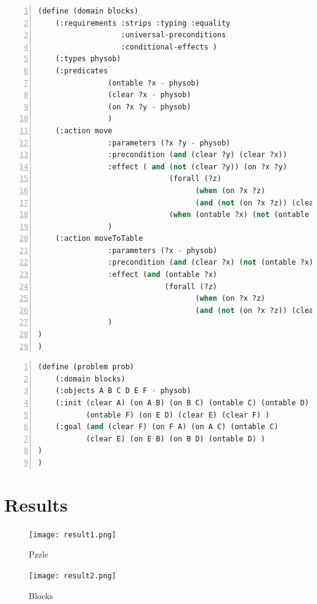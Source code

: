 ﻿\documentclass[a4paper, 11pt]{article}
\begin{document}
\begin{lstlisting}[title=domain\_blocks.pddl,frame=single,language=lisp,numbers=left]
(define (domain blocks)
	(:requirements :strips :typing :equality
				   :universal-preconditions
				   :conditional-effects )
    (:types physob)
    (:predicates
                (ontable ?x - physob)
                (clear ?x - physob)
                (on ?x ?y - physob)
                )
    (:action move
                :parameters (?x ?y - physob)
                :precondition (and (clear ?y) (clear ?x))
                :effect ( and (not (clear ?y)) (on ?x ?y)
                              (forall (?z)
                                    (when (on ?x ?z)
                                    (and (not (on ?x ?z)) (clear ?z)) ))
                              (when (ontable ?x) (not (ontable ?x)) )  )
                )
    (:action moveToTable
                :parameters (?x - physob)
                :precondition (and (clear ?x) (not (ontable ?x)))
                :effect (and (ontable ?x)
                             (forall (?z)
                                    (when (on ?x ?z)
                                    (and (not (on ?x ?z)) (clear ?z)) ))
                )
)
)
\end{lstlisting}

\begin{lstlisting}[title=blocks.pddl,frame=single,language=lisp,numbers=left]
(define (problem prob)
	(:domain blocks)
	(:objects A B C D E F - physob)
	(:init (clear A) (on A B) (on B C) (ontable C) (ontable D)
	       (ontable F) (on E D) (clear E) (clear F) )
	(:goal (and (clear F) (on F A) (on A C) (ontable C)
	       (clear E) (on E B) (on B D) (ontable D) )
)
)
\end{lstlisting}

\section{Results}
\begin{figure}[h]
\centering
\texttt{[image: result1.png]}
\caption{Pzzle}
\label{fig:1}
\end{figure}

\begin{figure}[h]
\centering
\texttt{[image: result2.png]}
\caption{Blocks}
\label{fig:1}
\end{figure}

%
%
\end{document}
